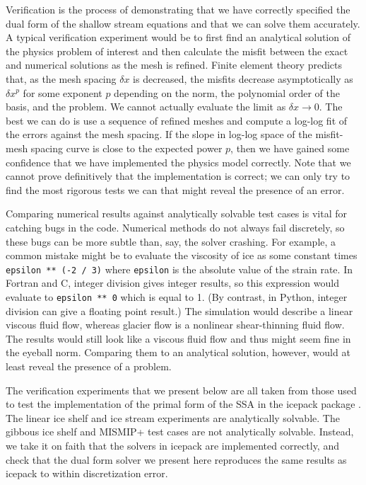 \documentclass{article}
\theoremstyle{definition}
\theoremstyle{plain}
\begin{document}
Verification is the process of demonstrating that we have correctly specified the dual form of the shallow stream equations and that we can solve them accurately.
A typical verification experiment would be to first find an analytical solution of the physics problem of interest and then calculate the misfit between the exact and numerical solutions as the mesh is refined.
Finite element theory predicts that, as the mesh spacing $\delta x$ is decreased, the misfits decrease asymptotically as $\delta x^p$ for some exponent $p$ depending on the norm, the polynomial order of the basis, and the problem.
We cannot actually evaluate the limit as $\delta x \to 0$.
The best we can do is use a sequence of refined meshes and compute a log-log fit of the errors against the mesh spacing.
If the slope in log-log space of the misfit-mesh spacing curve is close to the expected power $p$, then we have gained some confidence that we have implemented the physics model correctly.
Note that we cannot prove definitively that the implementation is correct; we can only try to find the most rigorous tests we can that might reveal the presence of an error.

Comparing numerical results against analytically solvable test cases is vital for catching bugs in the code.
Numerical methods do not always fail discretely, so these bugs can be more subtle than, say, the solver crashing.
For example, a common mistake might be to evaluate the viscosity of ice as some constant times \texttt{epsilon ** (-2 / 3)} where \texttt{epsilon} is the absolute value of the strain rate.
In Fortran and C, integer division gives integer results, so this expression would evaluate to \texttt{epsilon ** 0} which is equal to 1.
(By contrast, in Python, integer division can give a floating point result.)
The simulation would describe a linear viscous fluid flow, whereas glacier flow is a nonlinear shear-thinning fluid flow.
The results would still look like a viscous fluid flow and thus might seem fine in the eyeball norm.
Comparing them to an analytical solution, however, would at least reveal the presence of a problem.

The verification experiments that we present below are all taken from those used to test the implementation of the primal form of the SSA in the icepack package \citep{shapero2021icepack}.
The linear ice shelf and ice stream experiments are analytically solvable.
The gibbous ice shelf and MISMIP+ test cases are not analytically solvable.
Instead, we take it on faith that the solvers in icepack are implemented correctly, and check that the dual form solver we present here reproduces the same results as icepack to within discretization error.
\end{document}
